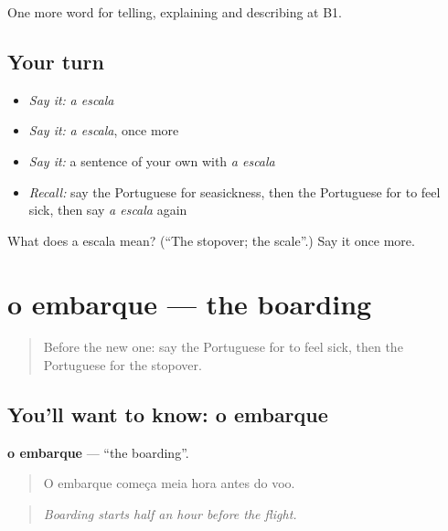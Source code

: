 \begin{grammarlens}[title={What you've built}]
One more word for telling, explaining and describing at B1.
\end{grammarlens}

\subsection*{Your turn}
\begin{itemize}
\raggedright
  \item \emph{Say it:} \emph{a escala}
  \item \emph{Say it:} \emph{a escala}, once more
  \item \emph{Say it:} a sentence of your own with \emph{a escala}
  \item \emph{Recall:} say the Portuguese for seasickness, then the Portuguese for to feel sick, then say \emph{a escala} again
\end{itemize}

\begin{tcolorbox}[breakable,colback=teal!4,colframe=teal!35!black,title={Before you move on}]
What does a escala mean? (\textquotedblleft{}The stopover; the scale\textquotedblright{}.) Say it once more.
\end{tcolorbox}
\section[o embarque]{o embarque — the boarding}

\label{lesson:PT-C421-embarque}



\begin{quote}
Before the new one: say the Portuguese for to feel sick, then the Portuguese for the stopover.
\end{quote}

\subsection*{You'll want to know: o embarque}
\textbf{o embarque} — \textquotedblleft{}the boarding\textquotedblright{}.

\begin{quote}
O embarque começa meia hora antes do voo.
\end{quote}

\begin{quote}
\emph{Boarding starts half an hour before the flight.}
\end{quote}

